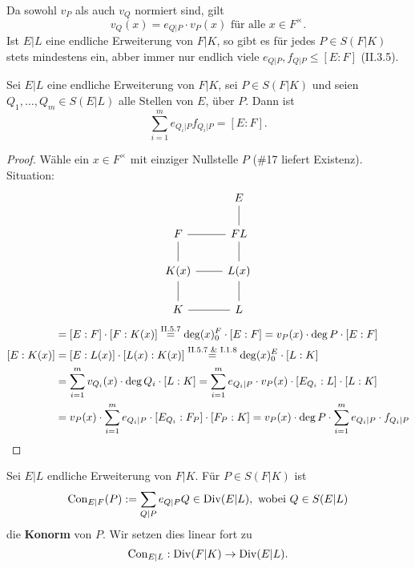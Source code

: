 \begin{bemerkungnr}
    Da sowohl $v_P$ als auch $v_Q$ normiert sind, gilt
    $$ v_Q(x) = e_{Q|P} \cdot v_P(x) \text{ für alle } x \in F^\times.$$
    Ist $E|L$ eine endliche Erweiterung von $F|K$, so gibt es für jedes $P \in S(F|K)$ stets mindestens ein, abber immer nur
    endlich viele $e_{Q|P}, f_{Q|P} \leq [E:F]$ (II.3.5).
\end{bemerkungnr}

\begin{theorem}
    Sei $E|L$ eine endliche Erweiterung von $F|K$, sei $P \in S(F|K)$ und seien $Q_1,\ldots,Q_m \in S(E|L)$ alle Stellen von
    $E$, über $P$. Dann ist
    $$ \sum\limits_{i=1}^m e_{Q_i|P}f_{Q_i|P} = [E:F]. $$
\end{theorem}
\begin{proof}
    Wähle ein $x \in F^\times$ mit einziger Nullstelle $P$ (\#17 liefert Existenz).
    Situation:
    $$\begin{tikzcd}
        & E\\
        F \rar[dash] & FL \uar[dash]\\
        K(x) \uar[dash] \rar[dash] & L(x) \uar[dash]\\
        K \uar[dash] \rar[dash] & L \uar[dash]  
    \end{tikzcd}$$
    \begin{align*}
        [E:K(x)] & = [E:F] \cdot [F:K(x)] \stackeq{\text{II.5.7}} \deg (x)_0^F \cdot [E:F] = v_P(x) \cdot \deg P \cdot [E:F]\\
        [E:K(x)] & = [E:L(x)] \cdot [L(x) : K(x)] \stackeq{\text{II.5.7 \& I.1.8}} \deg (x)_0^E \cdot [L:K] \\
        & = \sum\limits_{i=1}^m v_{Q_i}(x)\cdot \deg Q_i\cdot [L:K] = \sum\limits_{i=1}^m e_{Q_i|P} \cdot v_P(x) \cdot [E_{Q_i}:L] \cdot [L:K]\\
        & = v_P(x) \cdot \sum\limits_{i=1}^m e_{Q_i|P} \cdot [E_{Q_i}:F_P] \cdot [F_P : K] = v_P(x) \cdot \deg P \cdot \sum\limits_{i=1}^m e_{Q_i|P} \cdot f_{Q_i|P}
    \end{align*}
\end{proof}

\begin{definition}
    Sei $E|L$ endliche Erweiterung von $F|K$. Für $P \in S(F|K)$ ist 
    \begin{align*}
        \operatorname{Con}_{E|F}(P) := \sum\limits_{Q|P} e_{Q|P} Q \in \operatorname{Div}(E|L), \text{ wobei } Q \in S(E|L)
    \end{align*}
    die \textbf{Konorm} von $P$. Wir setzen dies linear fort zu
    $$ \operatorname{Con}_{E|L} : \operatorname{Div}(F|K) \to \operatorname{Div}(E|L).$$
\end{definition}

